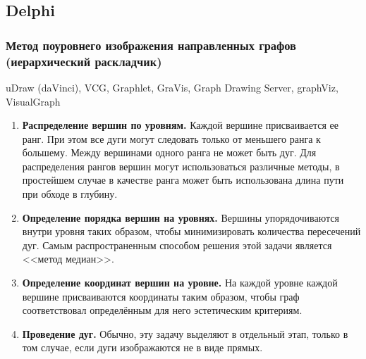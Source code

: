 \documentclass{beamer}
\begin{document}

\subsection{Delphi}
\begin{frame}
\frametitle{Метод поуровнего изображения направленных графов (иерархический раскладчик)}
\scriptsize{

uDraw (daVinci), VCG, Graphlet, GraVis, Graph Drawing Server, graphViz, VisualGraph

\begin{enumerate}
	\item \textbf{Распределение вершин по уровням.} Каждой вершине присваивается ее ранг. При этом все дуги могут следовать только от меньшего ранга к большему. Между вершинами одного ранга не может быть дуг. Для распределения рангов вершин могут использоваться различные методы, в простейшем случае в качестве ранга может быть использована длина пути при обходе в глубину.
	\item \textbf{Определение порядка вершин на уровнях.} Вершины упорядочиваются внутри уровня таких образом, чтобы минимизировать количества пересечений дуг. Самым распространенным способом решения этой задачи является <<метод медиан>>.
	\item \textbf{Определение координат вершин на уровне.} На каждой уровне каждой вершине присваиваются координаты таким образом, чтобы граф соответствовал определённым для него эстетическим критериям. 
	\item \textbf{Проведение дуг.}	Обычно, эту задачу выделяют в отдельный этап, только в том случае, если дуги изображаются не в виде прямых.
\end{enumerate}
}
\end{frame}

\end{document}
